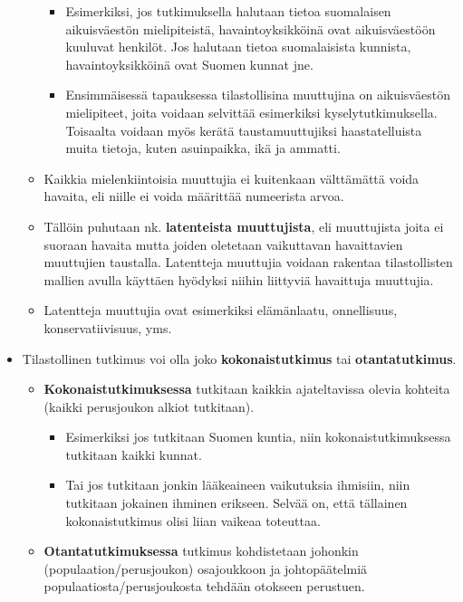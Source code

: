 \documentclass[
]{book}
\providecommand{\tightlist}{%
  \setlength{\itemsep}{0pt}\setlength{\parskip}{0pt}}
\begin{document}
\begin{itemize}
\begin{itemize}
    \begin{itemize}
    \tightlist
    \item
      Esimerkiksi, jos tutkimuksella halutaan tietoa suomalaisen aikuisväestön mielipiteistä, havaintoyksikköinä ovat aikuisväestöön kuuluvat henkilöt. Jos halutaan tietoa suomalaisista kunnista, havaintoyksikköinä ovat Suomen kunnat jne.
    \item
      Ensimmäisessä tapauksessa tilastollisina muuttujina on aikuisväestön mielipiteet, joita voidaan selvittää esimerkiksi kyselytutkimuksella. Toisaalta voidaan myös kerätä taustamuuttujiksi haastatelluista muita tietoja, kuten asuinpaikka, ikä ja ammatti.
    \end{itemize}
  \item
    Kaikkia mielenkiintoisia muuttujia ei kuitenkaan välttämättä voida havaita, eli niille ei voida määrittää numeerista arvoa.
  \item
    Tällöin puhutaan nk. \textbf{latenteista muuttujista}, eli muuttujista joita ei suoraan havaita mutta joiden oletetaan vaikuttavan havaittavien muuttujien taustalla. Latentteja muuttujia voidaan rakentaa tilastollisten mallien avulla käyttäen hyödyksi niihin liittyviä havaittuja muuttujia.
  \item
    Latentteja muuttujia ovat esimerkiksi elämänlaatu, onnellisuus, konservatiivisuus, yms.
  \end{itemize}
\item
  Tilastollinen tutkimus voi olla joko \textbf{kokonaistutkimus} tai \textbf{otantatutkimus}.

  \begin{itemize}
  \tightlist
  \item
    \textbf{Kokonaistutkimuksessa} tutkitaan kaikkia ajateltavissa olevia kohteita (kaikki perusjoukon alkiot tutkitaan).

    \begin{itemize}
    \tightlist
    \item
      Esimerkiksi jos tutkitaan Suomen kuntia, niin kokonaistutkimuksessa tutkitaan kaikki kunnat.
    \item
      Tai jos tutkitaan jonkin lääkeaineen vaikutuksia ihmisiin, niin tutkitaan jokainen ihminen erikseen. Selvää on, että tällainen kokonaistutkimus olisi liian vaikeaa toteuttaa.
    \end{itemize}
  \item
    \textbf{Otantatutkimuksessa} tutkimus kohdistetaan johonkin (populaation/perusjoukon) osajoukkoon ja johtopäätelmiä populaatiosta/perusjoukosta tehdään otokseen perustuen.


\end{itemize}
\end{itemize}
\end{document}
